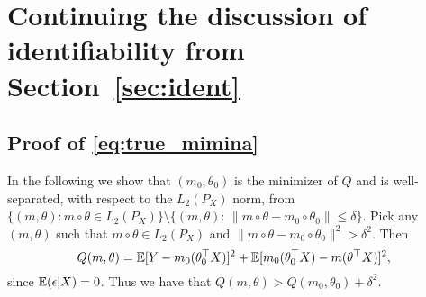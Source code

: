 \section{Continuing the discussion of identifiability from Section~\ref{sec:ident}}\label{sec:proof:Estims}
\subsection[Proof of (\ref{eq:true_mimina})]{Proof of \eqref{eq:true_mimina}}\label{proof:lem:Ident_cvxSim}
 In the following we show that $(m_0,\theta_0)$ is the  minimizer of $Q$ and is well-separated, with respect to the $L_2(P_X)$ norm, from $\{(m, \theta): m\circ\theta \in L_2(P_X)\}\setminus \{(m,\theta):\,\|m\circ\theta - m_0\circ\theta_0\| \le \delta\}$. Pick any $(m,\theta)$ such that $ m\circ\theta \in L_2(P_X)$ and $\|m\circ\theta - m_0\circ\theta_0\|^2 > \delta^2$. Then
\[
Q(m,\theta) = \mathbb{E} [Y-m_0(\theta_0^\top X)]^2 + \mathbb{E}[m_0(\theta_0^\top X) - m(\theta^\top X)]^2,
\]
since $\mathbb{E}(\epsilon|X) = 0$. Thus we have that $Q(m,\theta) > Q(m_0, \theta_0)+ \delta^2.$
